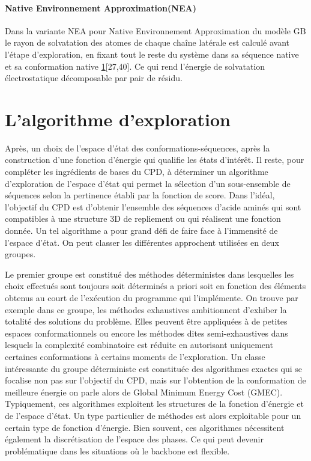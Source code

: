 \paragraph{\og Native Environnement Approximation\fg (NEA)}
\label{NEA}
Dans la variante NEA pour \og Native Environnement Approximation \fg  du modèle GB le rayon de solvatation des atomes de chaque chaîne latérale est calculé avant l'étape d'exploration, en fixant tout le reste du système dans sa séquence native et sa conformation native \ref {}{}[27,40]. Ce qui rend l'énergie de solvatation électrostatique décomposable par pair de résidu.


\section{L'algorithme d'exploration}

Après, un choix de l'espace d'état des conformations-séquences, après la construction d'une fonction d'énergie qui qualifie les états d'intérêt. Il reste, pour compléter les ingrédients de bases du CPD, à déterminer un algorithme d'exploration de l'espace d'état qui permet la sélection d'un sous-ensemble de séquences selon la pertinence établi par la fonction de score. Dans l'idéal, l'objectif du CPD est d'obtenir l'ensemble des séquences d'acide aminés qui sont compatibles à une structure 3D de repliement ou qui réalisent une fonction donnée. Un tel algorithme a pour grand défi de faire face à l'immensité de l'espace d'état. On peut classer les différentes approchent utilisées en deux groupes.

  Le premier groupe est constitué des méthodes déterministes dans lesquelles les choix effectués sont toujours soit déterminés a priori soit en fonction des éléments obtenus au court de l'exécution du programme qui l'implémente. On trouve par exemple dans ce groupe, les méthodes exhaustives ambitionnent d'exhiber la totalité des solutions du problème. Elles peuvent être appliquées à de petites espaces conformationnels ou encore les méthodes dites semi-exhaustives dans lesquels la complexité combinatoire est réduite en autorisant uniquement certaines conformations à certains moments de l'exploration. Un classe intéressante du groupe déterministe est constituée des algorithmes exactes qui se focalise non pas sur l'objectif du CPD, mais sur l'obtention de la conformation de meilleure énergie on parle alors de \og Global Minimum Energy Cost \fg (GMEC).
Typiquement, ces algorithmes exploitent les structures de la fonction d'énergie et de l'espace d'état. Un type particulier de méthodes est alors exploitable pour un certain type de fonction d'énergie. Bien souvent, ces algorithmes nécessitent également la discrétisation de l'espace des phases. Ce qui peut devenir problématique dans les situations où le backbone est flexible.
  
